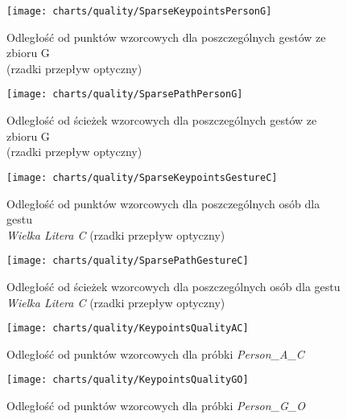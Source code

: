     \newpage
    \begin{figure}[!ht]
      \centering
      \texttt{[image: charts/quality/SparseKeypointsPersonG]}
      \caption[Odległość od punktów wzorcowych dla poszczególnych gestów]
              {Odległość od punktów wzorcowych dla poszczególnych gestów ze zbioru G\\(rzadki przepływ optyczny)}
      \label{fig:SparseKeypointsPersonG}
    \end{figure}

    \begin{figure}[!ht]
      \centering
      \texttt{[image: charts/quality/SparsePathPersonG]}
      \caption[Odległość od ścieżek wzorcowych dla poszczególnych gestów]
              {Odległość od ścieżek wzorcowych dla poszczególnych gestów ze zbioru G\\(rzadki przepływ optyczny)}
      \label{fig:SparsePathPersonG}
    \end{figure}

    \newpage
    \begin{figure}[!ht]
      \centering
      \texttt{[image: charts/quality/SparseKeypointsGestureC]}
      \caption[Odległość od punktów wzorcowych dla poszczególnych osób dla gestu C]
              {Odległość od punktów wzorcowych dla poszczególnych osób dla gestu\\\textit{Wielka Litera C} (rzadki przepływ optyczny)}
      \label{fig:SparseKeypointsGestureC}
    \end{figure}

    \begin{figure}[!ht]
      \centering
      \texttt{[image: charts/quality/SparsePathGestureC]}
      \caption[Odległość od ścieżek wzorcowych dla poszczególnych osób dla gestu C]
              {Odległość od ścieżek wzorcowych dla poszczególnych osób dla gestu\\\textit{Wielka Litera C} (rzadki przepływ optyczny)}
      \label{fig:SparsePathGestureC}
    \end{figure}

    \newpage
    \begin{figure}[!ht]
      \centering
      \texttt{[image: charts/quality/KeypointsQualityAC]}
      \caption[Odległość od punktów wzorcowych]
              {Odległość od punktów wzorcowych dla próbki \textit{Person\_A\_C}}
      \label{fig:KeypointsQualityAC}
    \end{figure}

    \begin{figure}[!ht]
      \centering
      \texttt{[image: charts/quality/KeypointsQualityGO]}
      \caption[Odległość od punktów wzorcowych]
              {Odległość od punktów wzorcowych dla próbki \textit{Person\_G\_O}}
      \label{fig:KeypointsQualityGO}
    \end{figure}

